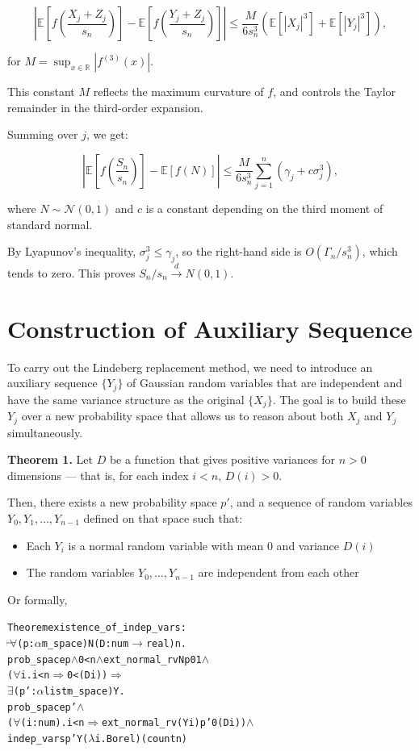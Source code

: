 \[
\left| \mathbb{E}\left[f\left( \frac{X_j + Z_j}{s_n} \right)\right] -
       \mathbb{E}\left[f\left( \frac{Y_j + Z_j}{s_n} \right)\right]
\right| \leq
\frac{M}{6 s_n^3} \left( \mathbb{E}[|X_j|^3] + \mathbb{E}[|Y_j|^3] \right),
\]

for  $M = \sup_{x \in \mathbb{R}} \left| f^{(3)}(x) \right|$.

This constant $M$ reflects the maximum curvature of $f$, and controls the Taylor remainder in the third-order expansion.

Summing over $j$, we get:

\[
\left| \mathbb{E}\left[f\left( \frac{S_n}{s_n} \right) \right] -
       \mathbb{E}[f(N)]
\right| \leq
\frac{M}{6 s_n^3} \sum_{j=1}^n \left( \gamma_j + c \sigma_j^3 \right),
\]

where $N \sim \mathcal{N}(0, 1)$ and $c$ is a constant depending on the third moment of standard normal.

By Lyapunov’s inequality, $\sigma_j^3 \leq \gamma_j$, so the right-hand side is $O(\Gamma_n / s_n^3)$, which tends to zero. This proves $S_n / s_n \xrightarrow{d} N(0,1)$.


\section {Construction of Auxiliary Sequence}

To carry out the Lindeberg replacement method, we need to introduce an auxiliary sequence $\{Y_j\}$ of Gaussian random variables that are independent and have the same variance structure as the original $\{X_j\}$. The goal is to build these $Y_j$ over a new probability space that allows us to reason about both $X_j$ and $Y_j$ simultaneously.

\textbf{Theorem 1.}
Let $D$ be a function that gives positive variances for $n > 0$ dimensions — that is, for each index $i < n$, $D(i) > 0$.

Then, there exists a new probability space $p'$, and a sequence of random variables $Y_0, Y_1, \dots, Y_{n-1}$ defined on that space such that:
\begin{itemize}
\item Each $Y_i$ is a normal random variable with mean 0 and variance $D(i)$
\item The random variables $Y_0, \dots, Y_{n-1}$ are independent from each other
\end{itemize}

Or formally,

\begin{hol}
  \begin{alltt}
    Theorem existence\_of\_indep\_vars :
    \(\!\!\!{\turn}\!\!\!\!\) \(\forall\)(p :\(\alpha\) m\_space) N (D :num \(\rightarrow\) real) n.
    prob\_space p \(\land\) 0 < n \(\land\) ext\_normal\_rv N p 0 1 \(\land\)
    (\(\forall\)i. i < n \(\Rightarrow\) 0 < (D i)) \(\Rightarrow\)
    \(\exists\)(p' :\(\alpha\) list m\_space) Y.
    prob\_space p' \(\land\)
    (\(\forall\)(i :num). i < n \(\Rightarrow\) ext\_normal\_rv (Y i) p' 0 (D i)) \(\land\)
    indep\_vars p' Y (\(\lambda\)i. Borel) (count n)
  \end{alltt}
\end{hol}

